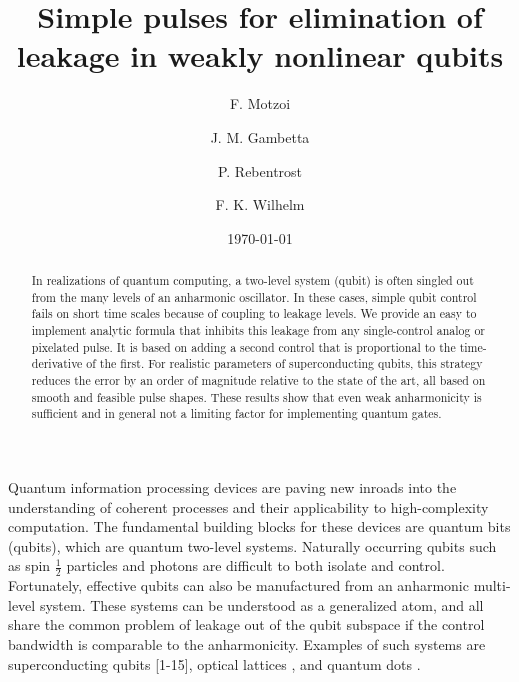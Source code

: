 \documentclass[prl,twocolumn,aps,final,floatfix,superscriptaddress,showpacs]{revtex4}
\newcommand{\sfrac}[2]{\mbox{$\frac{#1}{#2}$}}
\begin{document}
\title{Simple pulses for elimination of leakage in weakly nonlinear qubits}
\date{\today}
\author{F. Motzoi}
\author{J. M. Gambetta}
\author{P. Rebentrost}
\author{F. K. Wilhelm}

\begin{abstract}
In realizations of quantum computing, a two-level system (qubit) is often singled out from the many levels of an anharmonic oscillator. 
In these cases, simple qubit control fails on short time scales because of coupling to leakage levels. We provide an easy to implement 
analytic formula that inhibits this leakage from any single-control analog or pixelated pulse. It is based on adding a second control that is proportional to the time-derivative of the first. 
For realistic parameters of superconducting qubits, this strategy reduces the error by an order of magnitude relative to the state of the art, all based on  smooth and feasible pulse shapes. These results show that even weak anharmonicity is sufficient and in general not a limiting factor for implementing quantum gates.
\end{abstract}
\maketitle

Quantum information processing devices are paving new inroads into the understanding of coherent processes and their applicability to high-complexity computation. The fundamental building blocks for these devices are quantum bits (qubits), which are quantum two-level systems. Naturally occurring qubits such as spin $\sfrac{1}{2}$ particles and photons are difficult to both isolate and control. Fortunately, effective qubits can also be manufactured from an anharmonic multi-level system.  These systems can be understood as a generalized atom, and all share the common problem of leakage out of the qubit subspace if the control bandwidth  is comparable to the anharmonicity. Examples of such systems are superconducting qubits [1-15], optical lattices \cite{Maneshi:2008a}, and quantum dots \cite{Schliemann:2008a}. 
 
\end{document}
